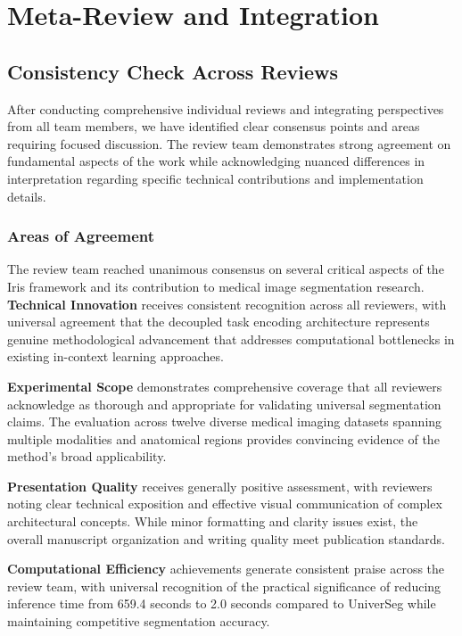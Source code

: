 \section{Meta-Review and Integration}
\label{sec:meta_review}

\subsection{Consistency Check Across Reviews}
After conducting comprehensive individual reviews and integrating perspectives from all team members, we have identified clear consensus points and areas requiring focused discussion. The review team demonstrates strong agreement on fundamental aspects of the work while acknowledging nuanced differences in interpretation regarding specific technical contributions and implementation details.

\subsubsection{Areas of Agreement}
The review team reached unanimous consensus on several critical aspects of the Iris framework and its contribution to medical image segmentation research. \textbf{Technical Innovation} receives consistent recognition across all reviewers, with universal agreement that the decoupled task encoding architecture represents genuine methodological advancement that addresses computational bottlenecks in existing in-context learning approaches.

\textbf{Experimental Scope} demonstrates comprehensive coverage that all reviewers acknowledge as thorough and appropriate for validating universal segmentation claims. The evaluation across twelve diverse medical imaging datasets spanning multiple modalities and anatomical regions provides convincing evidence of the method's broad applicability.

\textbf{Presentation Quality} receives generally positive assessment, with reviewers noting clear technical exposition and effective visual communication of complex architectural concepts. While minor formatting and clarity issues exist, the overall manuscript organization and writing quality meet publication standards.

\textbf{Computational Efficiency} achievements generate consistent praise across the review team, with universal recognition of the practical significance of reducing inference time from 659.4 seconds to 2.0 seconds compared to UniverSeg while maintaining competitive segmentation accuracy.

